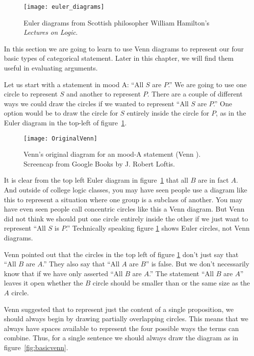 \begin{figure}
\begin{center}
\texttt{[image: euler\_diagrams]}
\end{center}
\caption{Euler diagrams from Scottish philosopher William Hamilton's \textit{Lectures on Logic}.}
\label{fig:euler_circles}
\end{figure}

In this section we are going to learn to use Venn diagrams to represent our four basic types of categorical statement. Later in this chapter, we will find them useful in evaluating arguments.

Let us start with a statement in mood A: ``All $S$ are $P$.'' We are going to use one circle to represent $S$ and another to represent $P$. There are a couple of different ways we could draw the circles if we wanted to represent ``All $S$ are $P$.'' One option would be to draw the circle for $S$ entirely inside the circle for $P$, as in the Euler diagram in the top-left of figure~\ref{fig:euler_circles}.

\begin{figure}
\begin{center}
\texttt{[image: OriginalVenn]}
\end{center}
\caption{Venn's original diagram for an mood-A statement (Venn \citep{Venn1880a}). Screencap from Google Books by J. Robert Loftis.}
\end{figure}


It is clear from the top left Euler diagram in figure~\ref{fig:euler_circles} that all $B$ are in fact $A$. And outside of college logic classes, you may have seen people use a diagram like this to represent a situation where one group is a subclass of another. You may have even seen people call concentric circles like this a Venn diagram. But Venn did not think we should put one circle entirely inside the other if we just want to represent ``All $S$ is $P$.'' Technically speaking figure \ref{fig:euler_circles} shows Euler circles, not Venn diagrams.

Venn pointed out that the circles in the top left of figure \ref{fig:euler_circles} don't just say that ``All $B$ are $A$.'' They also say that ``All $A$ are $B$'' is false. But we don't necessarily know that if we have only asserted ``All $B$ are $A$.'' The statement ``All $B$ are $A$'' leaves it open whether the $B$ circle should be smaller than or the same size as the $A$ circle.

Venn suggested that to represent just the content of a single proposition, we should always begin by drawing partially overlapping circles. This means that we always have spaces available to represent the four possible ways the terms can combine. Thus, for a single sentence we should always draw the diagram as in figure~\ref{fig:basicvenn}.

